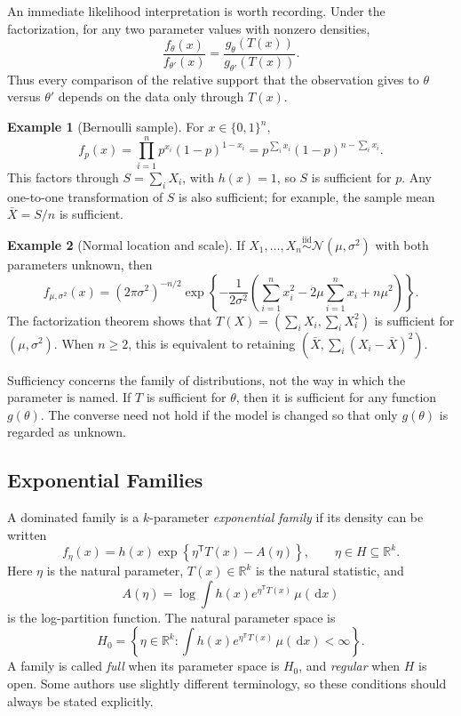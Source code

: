 \documentclass[12pt,oneside]{book}
\numberwithin{equation}{section}
\theoremstyle{definition}
\newtheorem{example}{Example}[section]
\theoremstyle{plain}
\theoremstyle{remark}
\newcommand{\R}{\mathbb{R}}
\newcommand{\iid}{\overset{\text{iid}}{\sim}}
\newcommand{\dd}{\,\mathrm{d}}
\newcommand{\Normal}{\mathcal{N}}
\begin{document}
An immediate likelihood interpretation is worth recording. Under the
factorization, for any two parameter values with nonzero densities,
\begin{equation}\label{eq:sufficient-relative-likelihood}
 \frac{f_\theta(x)}{f_{\theta'}(x)}
 =\frac{g_\theta(T(x))}{g_{\theta'}(T(x))}.
\end{equation}
Thus every comparison of the relative support that the observation gives to
$\theta$ versus $\theta'$ depends on the data only through $T(x)$.

\begin{example}[Bernoulli sample]
For $x\in\{0,1\}^n$,
\[
    f_p(x)=\prod_{i=1}^n p^{x_i}(1-p)^{1-x_i}
           =p^{\sum_i x_i}(1-p)^{n-\sum_i x_i}.
\]
This factors through $S=\sum_iX_i$, with $h(x)=1$, so $S$ is sufficient for
$p$.  Any one-to-one transformation of $S$ is also sufficient; for example,
the sample mean $\bar X=S/n$ is sufficient.
\end{example}

\begin{example}[Normal location and scale]
If $X_1,\ldots,X_n\iid\Normal(\mu,\sigma^2)$ with both parameters unknown,
then
\[
 f_{\mu,\sigma^2}(x)
 =(2\pi\sigma^2)^{-n/2}
 \exp\left\{-\frac{1}{2\sigma^2}
 \left(\sum_{i=1}^n x_i^2-2\mu\sum_{i=1}^n x_i+n\mu^2\right)\right\}.
\]
The factorization theorem shows that
$T(X)=(\sum_iX_i,\sum_iX_i^2)$ is sufficient for $(\mu,\sigma^2)$.  When
$n\geq2$, this is equivalent to retaining $(\bar X,\sum_i(X_i-\bar X)^2)$.
\end{example}

Sufficiency concerns the family of distributions, not the way in which the
parameter is named.  If $T$ is sufficient for $\theta$, then it is sufficient
for any function $g(\theta)$.  The converse need not hold if the model is
changed so that only $g(\theta)$ is regarded as unknown.

\subsection{Exponential Families}

A dominated family is a $k$-parameter \emph{exponential family} if its density
can be written
\begin{equation}
    f_\eta(x)
    =h(x)\exp\!\left\{\eta^\mathsf{T}T(x)-A(\eta)\right\},
    \qquad \eta\in H\subseteq\R^k.
    \label{eq:exponential-family}
\end{equation}
Here $\eta$ is the natural parameter, $T(x)\in\R^k$ is the natural statistic,
and
\[
    A(\eta)=\log\int h(x)e^{\eta^\mathsf{T}T(x)}\,\mu(\dd x)
\]
is the log-partition function.  The natural parameter space is
\[
    H_0=\left\{\eta\in\R^k:
    \int h(x)e^{\eta^\mathsf{T}T(x)}\,\mu(\dd x)<\infty\right\}.
\]
A family is called \emph{full} when its parameter space is $H_0$, and
\emph{regular} when $H$ is open.  Some authors use slightly different
terminology, so these conditions should always be stated explicitly.
\end{document}
